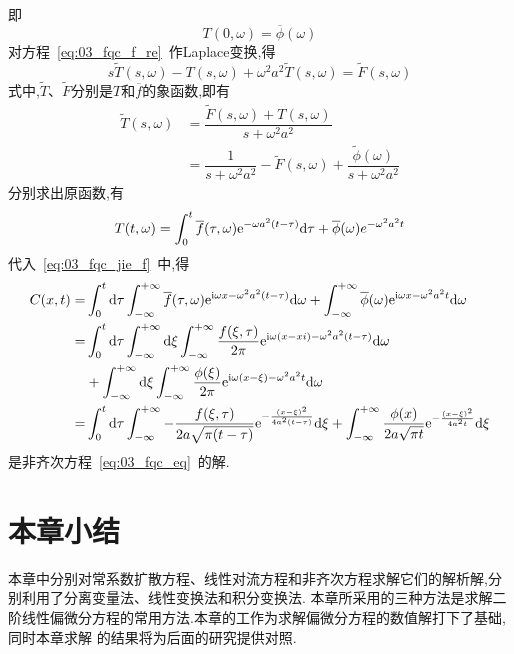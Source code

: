 即
\begin{equation}\label{eq:03_fqc_f_re_bj}
 T(0,\omega)=\overline{\phi}(\omega)
\end{equation}
对方程~\eqref{eq:03_fqc_f_re}~作Laplace变换,得
\begin{equation*}
 s\widetilde{T}(s,\omega)-T(s,\omega)+\omega^2 a^2\widetilde{T}(s,\omega)=\widetilde{F}(s,\omega)
\end{equation*}
式中,$\widetilde{T}$、$\widetilde{F}$分别是$T$和$\overline{f}$的象函数,即有
\begin{equation*}
\begin{aligned}
 \widetilde{T}(s,\omega)&= \dfrac{\widetilde{F}(s,\omega)+T(s,\omega)}{s+\omega^2a^2} \\
                    &= \dfrac{1}{s+\omega^2 a^2}-\widetilde{F}(s,\omega)+\dfrac{\widetilde{\phi}(\omega)}{s+\omega^2 a^2}
\end{aligned}
\end{equation*}
分别求出原函数,有
\begin{equation*}
 T(t,\omega)=\int_0^t\overline{f}(\tau,\omega)\mathrm{e}^{-\omega a^2(t-\tau)}\mathrm{d}\tau+\overline{\phi}(\omega)e^{-\omega^2 a^2 t}
\end{equation*}
代入~\eqref{eq:03_fqc_jie_f}~中,得
\begin{equation}
 \begin{split}
  C(x,t) =&\int_0^t\mathrm{d}\tau\int_{-\infty}^{+\infty}\overline{f}(\tau,\omega)\mathrm{e}^{\mathrm{i}\omega x-\omega^2 a^2(t-\tau)}\mathrm{d}\omega
         +\int_{-\infty}^{+\infty}\overline{\phi}(\omega)\mathrm{e}^{\mathrm{i}\omega x-\omega^2 a^2 t}\mathrm{d}\omega\\
         =&\int_0^t\mathrm{d}\tau\int_{-\infty}^{+\infty}\mathrm{d}\xi\int_{-\infty}^{+\infty}\dfrac{f(\xi,\tau)}{2\pi}\mathrm{e}^{\mathrm{i}\omega(x-xi)-\omega^2 a^2(t-\tau)}\mathrm{d}\omega
         \\&+\int_{-\infty}^{+\infty}\mathrm{d}\xi\int_{-\infty}^{+\infty}\dfrac{\phi(\xi)}{2\pi}\mathrm{e}^{\mathrm{i}\omega(x-\xi)-\omega^2 a^2 t}\mathrm{d}\omega\\
         =&\int_0^t\mathrm{d}\tau\int_{-\infty}^{+\infty}-\dfrac{f(\xi,\tau)}{2a\sqrt{\pi(t-\tau)}}\mathrm{e}^{-\frac{(x-\xi)^2}{4a^2(t-\tau)}}\mathrm{d}\xi
         +\int_{-\infty}^{+\infty}\frac{\phi(x)}{2a\sqrt{\pi t}}\mathrm{e}^{-\frac{(x-\xi)^2}{4a^2 t}}\mathrm{d}\xi
 \end{split}
\end{equation}
是非齐次方程~\eqref{eq:03_fqc_eq}~的解.
\section{本章小结}
本章中分别对常系数扩散方程、线性对流方程和非齐次方程求解它们的解析解,分别利用了分离变量法、线性变换法和积分变换法.
本章所采用的三种方法是求解二阶线性偏微分方程的常用方法.本章的工作为求解偏微分方程的数值解打下了基础,同时本章求解
的结果将为后面的研究提供对照.
